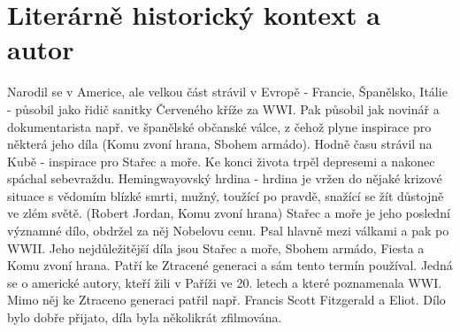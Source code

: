 \documentclass[11pt]{article}
\begin{document}
    \section*{Literárně historický kontext a autor}
    Narodil se v Americe, ale velkou část strávil v Evropě - Francie, Španělsko, Itálie - působil jako řidič sanitky Červeného kříže za WWI.
    Pak působil jak novinář a dokumentarista např. ve španělské občanské válce, z čehož plyne inspirace pro některá jeho díla (Komu zvoní hrana, Sbohem armádo).
    Hodně času strávil na Kubě - inspirace pro Stařec a moře.
    Ke konci života trpěl depresemi a nakonec spáchal sebevraždu.
    Hemingwayovský hrdina - hrdina je vržen do nějaké krizové situace s vědomím blízké smrti, mužný, toužící po pravdě, snažící se žít důstojně ve zlém světě. (Robert Jordan, Komu zvoní hrana)
    Stařec a moře je jeho poslední významné dílo, obdržel za něj Nobelovu cenu.
    Psal hlavně mezi válkami a pak po WWII. Jeho nejdůležitější díla jsou Stařec a moře, Sbohem armádo, Fiesta a Komu zvoní hrana.
    Patří ke Ztracené generaci a sám tento termín používal. Jedná se o americké autory, kteří žili v Paříži ve 20. letech a které poznamenala WWI.
    Mimo něj ke Ztraceno generaci patřil např. Francis Scott Fitzgerald a Eliot.
    Dílo bylo dobře přijato, díla byla několikrát zfilmována.
\end{document}
